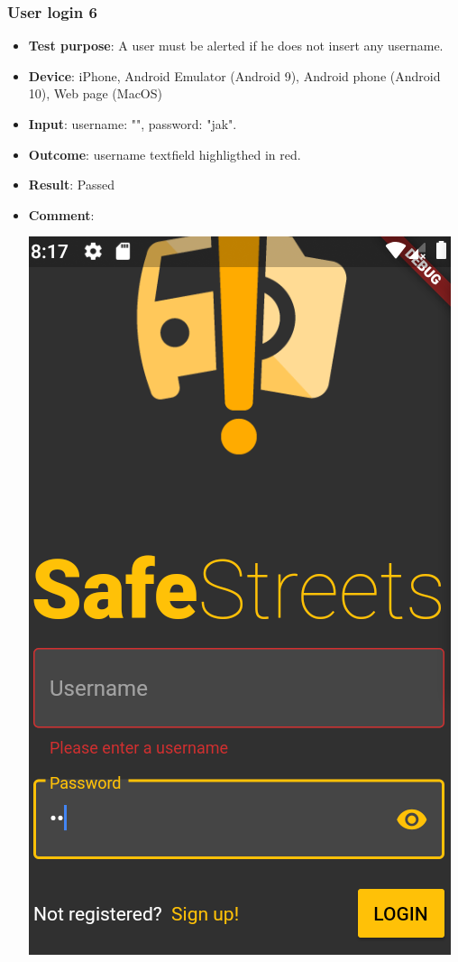 \documentclass[../ATD.tex]{subfiles}
\begin{document}
    \subsubsection{User login 6}\label{subsubsec:user-login-6}
    \begin{itemize}
        \item \textbf{Test purpose}: A user must be alerted if he does not insert any username.
        \item \textbf{Device}: iPhone, Android Emulator (Android 9), Android phone (Android 10), Web page (MacOS)
        \item \textbf{Input}: username: "", password: "jak".
        \item \textbf{Outcome}: username textfield highligthed in red.
        \item \textbf{Result}: Passed
        \item \textbf{Comment}:

        \includegraphics[scale = 0.3]{assets/noUserLogin.png}
    \end{itemize}
\end{document}

